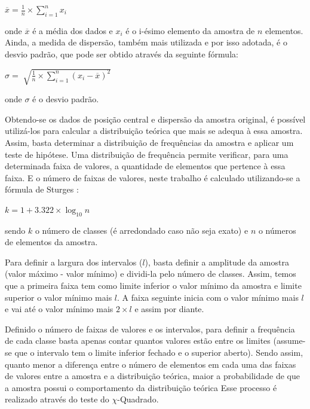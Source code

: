 \documentclass[pt,disc,oneside]{ufscpgeasthesis}
\begin{document}
				\begin{center}
					\LARGE{$\overline{x} = \frac{1}{n} \times \sum_{i = 1}^n x_i $}
				\end{center}

				onde $\overline{x}$ é a média dos dados e $x_i$ é o i-ésimo elemento da amostra de $n$ elementos.
				Ainda, a medida de dispersão, também mais utilizada e por isso adotada, é o desvio padrão, que pode ser obtido através da seguinte fórmula:

				\begin{center}
					\LARGE{$\sigma = \sqrt[]{\frac{1}{n} \times \sum_{i = 1}^{n} (x_i - \overline{x})^2 }$}
				\end{center}

				onde $\sigma$ é o desvio padrão.

				Obtendo-se os dados de posição central e dispersão da amostra original, é possível utilizá-los para calcular a distribuição teórica que mais se adequa à essa amostra.
				Assim, basta determinar a distribuição de frequências da amostra e aplicar um teste de hipótese.
				Uma distribuição de frequência permite verificar, para uma determinada faixa de valores, a quantidade de elementos que pertence à essa faixa.
				E o número de faixas de valores, neste trabalho é calculado utilizando-se a fórmula de Sturges \cite{Sturges}:

				\begin{center}
					\LARGE{$k = 1 + 3.322 \times \log_{10} n$}
				\end{center}

				sendo $k$ o número de classes (é arredondado caso não seja exato) e $n$ o números de elementos da amostra.

				Para definir a largura dos intervalos ($l$), basta definir a amplitude da amostra (valor máximo - valor mínimo) e dividi-la pelo número de classes.
				Assim, temos que a primeira faixa tem como limite inferior o valor mínimo da amostra e limite superior o valor mínimo mais $l$.
				A faixa seguinte inicia com o valor mínimo mais $l$ e vai até o valor mínimo mais $2 \times l$ e assim por diante. 

				Definido o número de faixas de valores e os intervalos, para definir a frequência de cada classe basta apenas contar quantos valores estão entre os limites (assume-se que o intervalo tem o limite inferior fechado e o superior aberto).
				Sendo assim, quanto menor a diferença entre o número de elementos em cada uma das faixas de valores entre a amostra e a distribuição teórica, maior a probabilidade de que a amostra possui o comportamento da distribuição teórica
				Esse processo é realizado através do teste do $\chi$-Quadrado.
\end{document}
